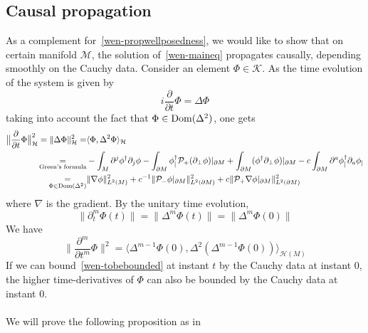 \subsection{Causal propagation}\label{wen-subsect-causal}
As a complement for~\cref{wen-propwellposedness},
we would like to show that on certain manifold $\mathcal{M}$, 
the solution of~\cref{wen-maineq} propagates causally, \ie depending smoothly on the Cauchy data.
Consider an element $\Phi \in \mathcal{K}$.
As the time evolution of the system is given by
\begin{equation*}
i \frac{\partial }{\partial t} \Phi = \Delta \Phi 
\end{equation*}
taking into account the fact that $\Phi\in\mathrm{Dom}(\Delta^2)$, one gets
\begin{equation}\label{wen-tobebounded}
\begin{split}
\big\| \frac{\partial }{\partial t} \Phi \big\|^2_\mathcal{H} = \| \Delta \Phi \|^2_{\mathcal{H}}  = &
\langle \Phi, \Delta^2 \Phi \rangle_{\mathcal{H}}   \\ 
\underset{\textrm{Green's formula}}=
& - \int_M \partial^j \phi^\dagger \partial_j \phi 
 -  \int_{\partial M}\phi_|^\dagger \mathcal{P}_+(\partial_\bot \phi)\vert_{\partial M} 
 + \int_{\partial M} (\phi^\dagger \partial_\bot\phi)\vert_{\partial M}
- c\int_{\partial M} \partial^a \phi^\dagger_| \partial_a \phi_| \\
\underset{\Phi \in \mathrm{Dom}(\Delta^2)}{=} &
\|\nabla \phi \|^2_{L^2 (M)} + c^{-1} \| \mathcal{P}_- \phi\vert_{\partial M} \|^2_{L^2(\partial M)}
+ c \| \mathcal{P}_+ \nabla \phi\vert_{\partial M} \|^2_{L^2(\partial M)}
\end{split}
\end{equation}
where $\nabla$ is the gradient.
By the unitary time evolution, 
\begin{equation*}
\big\|\partial_t^m \Phi(t) \big\|= 
\big\|\Delta^m\Phi(t) \big\| =
\big\|\Delta^m \Phi(0) \big\|
\end{equation*} 
We have
\begin{equation*}
 \Big\|\frac{\partial^{m}}{\partial t^{m}} \Phi \Big\|^2 = 
 \langle \Delta^{m-1}\Phi(0), \Delta^{2}(\Delta^{m-1} \Phi(0))\rangle_{\mathcal{H}(M)} 
\end{equation*}
If we can bound~\cref{wen-tobebounded} at instant $t$ by the Cauchy data at instant $0$, 
the higher time-derivatives of $\Phi$ can also be bounded by the Cauchy data at instant $0$.\\\\
We will prove the following proposition as in~\cite{Zahn2016}

